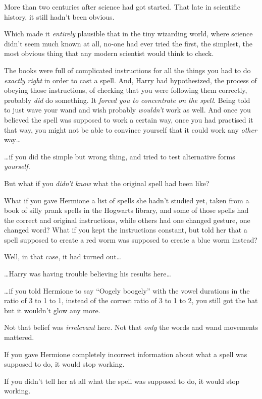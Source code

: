 More than two centuries after science had got started. That late in scientific history, it still hadn’t been obvious.

Which made it \emph{entirely} plausible that in the tiny wizarding world, where science didn’t seem much known at all, no-one had ever tried the first, the simplest, the most obvious thing that any modern scientist would think to check.

The books were full of complicated instructions for all the things you had to do \emph{exactly right} in order to cast a spell. And, Harry had hypothesized, the process of obeying those instructions, of checking that you were following them correctly, probably \emph{did} do something. It \emph{forced you to concentrate on the spell}. Being told to just wave your wand and wish probably \emph{wouldn’t} work as well. And once you believed the spell was supposed to work a certain way, once you had practised it that way, you might not be able to convince yourself that it could work any \emph{other} way…

…if you did the simple but wrong thing, and tried to test alternative forms \emph{yourself.}

But what if you \emph{didn’t know} what the original spell had been like?

What if you gave Hermione a list of spells she hadn’t studied yet, taken from a book of silly prank spells in the Hogwarts library, and some of those spells had the correct and original instructions, while others had one changed gesture, one changed word? What if you kept the instructions constant, but told her that a spell supposed to create a red worm was supposed to create a blue worm instead?

Well, in that case, it had turned out…

…Harry was having trouble believing his results here…

…if you told Hermione to say “Oogely boogely” with the vowel durations in the ratio of 3 to 1 to 1, instead of the correct ratio of 3 to 1 to 2, you still got the bat but it wouldn’t glow any more.

Not that belief was \emph{irrelevant} here. Not that \emph{only} the words and wand movements mattered.

If you gave Hermione completely incorrect information about what a spell was supposed to do, it would stop working.

If you didn’t tell her at all what the spell was supposed to do, it would stop working.

